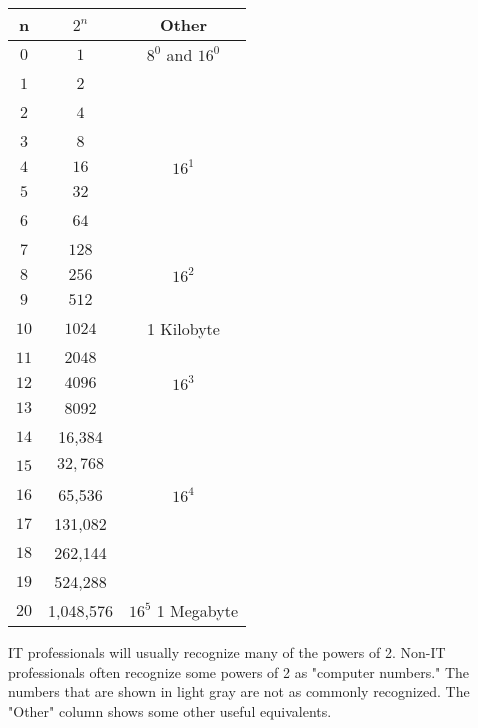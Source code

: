 \documentclass[letterpaper,12pt]{exam}
\begin{document}
\begin{center}
\begin{tabular}{| c | c | c |}
    \hline
        n & $2^n$ & Other \\
        \hline
    $0$ & $ 1 $ & $8^0$ and $16^0$ \\ 
    $1$ & $ 2 $ & \  \\ 
\hline
    $2$ & $ 4 $ & \  \\ 
    $3$ & $ 8 $ & \  \\ 
\hline
    $4$ & $ 16 $ & $16^1$ \\ 
    $5$ & $ 32 $ & \  \\ 
\hline
    $6$ & $ 64 $ & \  \\ 
    $7$ & $ 128 $ & \  \\ 
\hline
    $8$ & $ 256 $ & $16^2$ \\ 
    $9$ & $ 512 $ & \  \\ 
\hline
    $10$ & $ 1024 $ & 1 Kilobyte \\ 
    $11$ & $ 2048 $ & \  \\ 
\hline
    $12$ & $ 4096 $ & $16^3$ \\ 
    $13$ & {\color{lightgray}  8092}  & \  \\ 
\hline
    $14$ &  {\color{lightgray}  16,384} & \  \\ 
    $15$ & $ 32,768 $ & \  \\ 
\hline
    $16$ &   65,536  & $16^4$ \\ 
    $17$ & {\color{lightgray} 131,082 } & \  \\ 
\hline
      $18$ &   {\color{lightgray}  262,144} & \  \\ 
    $19$ &  {\color{lightgray} 524,288 } & \  \\ 
\hline
      $20$ & 1,048,576  & $16^5$ 1 Megabyte \\  
\hline
    \end{tabular}
\end{center}
IT professionals will usually recognize many of the powers of 2.  Non-IT professionals often recognize some powers of 2 as "computer numbers."  The numbers that are shown in {\color{lightgray} light gray} are not as commonly recognized.  The "Other" column shows some other useful equivalents.
\newpage
\par
\end{document}
